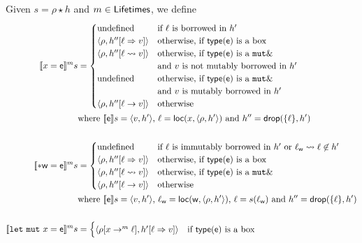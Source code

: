\begin{definition}\label{def:semantics_terms}
  Given $s=\rho\star h$ and $m\in\Lifetimes$, we define
  \begin{align*}
    \denl[x=\mathsf{e}]{m}{s}&=
    \begin{cases}
      \text{undefined} & \text{if $\ell$ is borrowed in $h'$}\\
      \langle\rho,h''[\ell\Rightarrow v]\rangle & \text{otherwise, if $\type(\mathsf{e})$ is a box}\\
      \langle\rho,h''[\ell\leadsto v]\rangle & \text{otherwise, if $\type(\mathsf{e})$ is a $\mathtt{mut}\borrow$}\\
                                             & \text{and $v$ is not mutably borrowed in $h'$}\\
      \text{undefined} & \text{otherwise, if $\type(\mathsf{e})$ is a $\mathtt{mut}\borrow$}\\
                       & \text{and $v$ is mutably borrowed in $h'$}\\
      \langle\rho,h''[\ell\to v]\rangle & \text{otherwise}
    \end{cases}\\
    &\text{where $\den[\mathsf{e}]{s}=\langle v,h'\rangle$, $\ell=\loc(x,\langle\rho,h'\rangle)$ and
      $h''=\drop(\{\ell\},h')$}\\
    \mbox{}\\
    \denl[*\mathsf{w}=\mathsf{e}]{m}{s}&=
    \begin{cases}
      \text{undefined} & \text{if $\ell$ is immutably borrowed in $h'$ or $\ell_{\mathsf{w}}\leadsto\ell\not\in h'$}\\
      \langle\rho,h''[\ell\Rightarrow v]\rangle & \text{otherwise, if $\type(\mathsf{e})$ is a box}\\
      \langle\rho,h''[\ell\leadsto v]\rangle & \text{otherwise, if $\type(\mathsf{e})$ is a $\mathtt{mut}\borrow$}\\
      \langle\rho,h''[\ell\to v]\rangle & \text{otherwise}
    \end{cases}\\
    &\text{where $\den[\mathsf{e}]{s}=\langle v,h'\rangle$, $\ell_{\mathsf{w}}=\loc(\mathsf{w},\langle\rho,h'\rangle)$,
      $\ell=s(\ell_{\mathsf{w}})$ and $h''=\drop(\{\ell\},h')$}\\
    \mbox{}\\
    \denl[\mathtt{let\ mut}\ x=\mathsf{e}]{m}{s}&=
    \begin{cases}
      \langle\rho[x\to^m\ell],h'[\ell\Rightarrow v]\rangle & \text{if $\type(\mathsf{e})$ is a box}\\

\end{cases}
\end{align*}
\end{definition}
